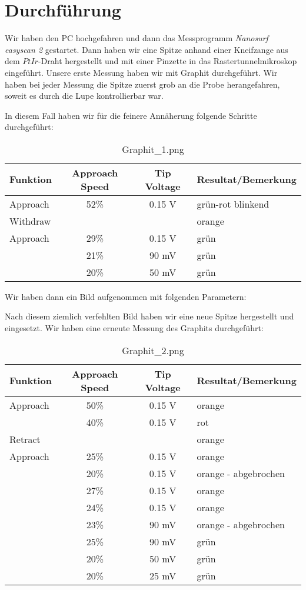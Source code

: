 \section{Durchführung}


Wir haben den PC hochgefahren und dann das Messprogramm \emph{Nanosurf easyscan 2} gestartet. Dann haben wir eine Spitze anhand einer Kneifzange aus dem $PtIr$-Draht hergestellt und mit einer Pinzette in das Rastertunnelmikroskop eingeführt. Unsere erste Messung haben wir mit Graphit durchgeführt. Wir haben bei jeder Messung die Spitze zuerst grob an die Probe herangefahren, soweit es durch die Lupe kontrollierbar war. 

In diesem Fall haben wir für die feinere Annäherung folgende Schritte durchgeführt:



\begin{table}[H]
\caption{Graphit\_1.png}
\centering \begin{tabular}[H]{l c c l}
Funktion & Approach Speed & Tip Voltage & Resultat/Bemerkung\\ \hline
Approach & 52\% & 0.15 V & grün-rot blinkend\\
Withdraw & & & orange\\
Approach & 29\% & 0.15 V & grün\\
 & 21\% & 90 mV & grün\\
 & 20\% & 50 mV & grün\\
\end{tabular}
\end{table}


Wir haben dann ein Bild aufgenommen mit folgenden Parametern:


Nach diesem ziemlich verfehlten Bild haben wir eine neue Spitze hergestellt und eingesetzt. Wir haben eine erneute Messung des Graphits durchgeführt: 

\begin{table}[H]
\caption{Graphit\_2.png}
\centering \begin{tabular}[H]{l c c l}
Funktion & Approach Speed & Tip Voltage & Resultat/Bemerkung\\ \hline
Approach & 50\% & 0.15 V & orange\\
 & 40\% & 0.15 V & rot\\
Retract & & & orange\\
Approach & 25\% & 0.15 V & orange\\
 & 20\% & 0.15 V & orange - abgebrochen\\
 & 27\% & 0.15 V & orange\\
 & 24\% & 0.15 V & orange\\
 & 23\% & 90 mV & orange - abgebrochen\\
 & 25\% & 90 mV & grün\\
 & 20\% & 50 mV & grün\\
 & 20\% & 25 mV & grün\\
\end{tabular}
\end{table}

